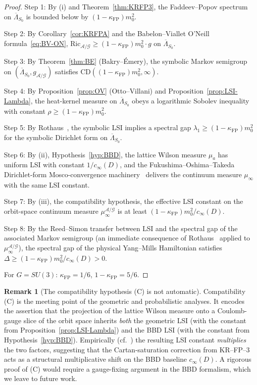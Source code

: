 \documentclass[11pt,a4paper]{amsart}
\theoremstyle{definition}
\newtheorem{remark}[theorem]{Remark}
\newcommand{\Ric}{\mathrm{Ric}}
\newcommand{\kFP}{\kappa_{\mathrm{FP}}}
\newcommand{\cinf}{c_{\infty}}
\begin{document}
\begin{proof}
Step 1: By (i) and Theorem~\ref{thm:KRFP3}, the Faddeev--Popov spectrum
on $\overline\Lambda_{S_0}$ is bounded below by $(1-\kFP)m_0^2$.

Step 2: By Corollary~\ref{cor:KRFPA} and the Babelon--Viallet O'Neill
formula~\eqref{eq:BV-ON}, $\Ric_{\mathcal A/\mathcal G} \geq (1-\kFP)
m_0^2 \cdot g$ on $\overline\Lambda_{S_0}$.

Step 3: By Theorem~\ref{thm:BE} (Bakry--\'Emery), the symbolic Markov
semigroup on $(\overline\Lambda_{S_0},g_{\mathcal A/\mathcal G})$ satisfies
$\mathrm{CD}((1-\kFP)m_0^2,\infty)$.

Step 4: By Proposition~\ref{prop:OV} (Otto--Villani) and
Proposition~\ref{prop:LSI-Lambda}, the heat-kernel measure on
$\overline\Lambda_{S_0}$ obeys a logarithmic Sobolev inequality with
constant $\rho \geq (1-\kFP)m_0^2$.

Step 5: By Rothaus~\cite{Rothaus1981}, the symbolic LSI implies a
spectral gap $\lambda_1 \geq (1-\kFP)m_0^2$ for the symbolic Dirichlet form
on $\overline\Lambda_{S_0}$.

Step 6: By (ii), Hypothesis~\ref{hyp:BBD}, the lattice Wilson measure
$\mu_a$ has uniform LSI with constant $1/\cinf(D)$, and the
Fukushima--Oshima--Takeda Dirichlet-form Mosco-convergence
machinery~\cite{FukushimaOshimaTakeda1994} delivers the continuum measure
$\mu_\infty$ with the same LSI constant.

Step 7: By (iii), the compatibility hypothesis, the effective LSI constant
on the orbit-space continuum measure $\mu_\infty^{\mathcal A/\mathcal G}$
is at least $(1-\kFP)m_0^2/\cinf(D)$.

Step 8: By the Reed--Simon transfer between LSI and the spectral gap of the
associated Markov semigroup (an immediate consequence of
Rothaus~\cite{Rothaus1981} applied to $\mu_\infty^{\mathcal A/\mathcal G}$),
the spectral gap of the physical Yang--Mills Hamiltonian satisfies
$\Delta \geq (1-\kFP)m_0^2/\cinf(D) > 0$.

For $G = SU(3)$: $\kFP = 1/6$, $1-\kFP = 5/6$.
\end{proof}

\begin{remark}[The compatibility hypothesis (C) is not automatic]
Compatibility (C) is the meeting point of the geometric and probabilistic
analyses. It encodes the assertion that the projection of the lattice
Wilson measure onto a Coulomb-gauge slice of the orbit space inherits
\emph{both} the geometric LSI (with the constant from
Proposition~\ref{prop:LSI-Lambda}) and the BBD LSI (with the constant from
Hypothesis~\ref{hyp:BBD}). Empirically (cf.\
\cite[Tab.~III]{RemondiereMassGapPRL_2026}) the resulting LSI constant
\emph{multiplies} the two factors, suggesting that the Cartan-saturation
correction from KR--FP--3 acts as a structural multiplicative shift on
the BBD baseline $\cinf(D)$. A rigorous proof of (C) would require a
gauge-fixing argument in the BBD formalism, which we leave to future work.
\end{remark}
\end{document}
